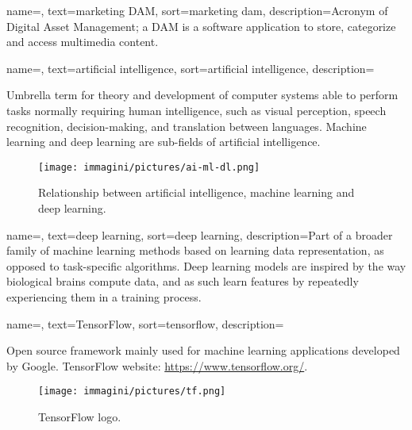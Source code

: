 
\renewcommand{\acronymname}{Acronyms}


    


{
	name=,
	text=marketing DAM,
	sort=marketing dam,
	description={Acronym of Digital Asset Management; a DAM is a software application to store, categorize and access multimedia content.}
}

{
	name=,
	text=artificial intelligence,
	sort=artificial intelligence,
	description={Umbrella term for theory and development of computer systems able to perform tasks normally requiring human intelligence, such as visual perception, speech recognition, decision-making, and translation between languages. Machine learning and deep learning are sub-fields of artificial intelligence.
\begin{figure}[htbp]
\begin{center}
\texttt{[image: immagini/pictures/ai-ml-dl.png]} 
\caption{Relationship between artificial intelligence, machine learning and deep learning.}
\end{center}
\end{figure}}
}

{
	name=,
	text=deep learning,
	sort=deep learning,
	description={Part of a broader family of machine learning methods based on learning data representation, as opposed to task-specific algorithms. Deep learning models are inspired by the way biological brains compute data, and as such learn features by repeatedly experiencing them in a training process.}
}

{
	name=,
	text=TensorFlow,
	sort=tensorflow,
	description={Open source framework mainly used for machine learning applications developed by Google. TensorFlow website: \url{https://www.tensorflow.org/}.
\begin{figure}[htbp]
\begin{center}
\texttt{[image: immagini/pictures/tf.png]} 
\caption{TensorFlow logo.}
\end{center}
\end{figure}}
}

